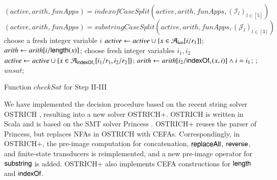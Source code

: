 
\begin{algorithm}[tbp]
	\small
	{
		$(active, arith, \mathit{funApps}) = \mathit{indexofCaseSplit}(active, arith, \mathit{funApps}, (\mathcal{I}_l)_{l \in [5]})$\; 
		$(active, arith, \mathit{funApps})= \mathit{substringCaseSplit}(active, arith, \mathit{funApps}, (\mathcal{J}_l)_{l \in [3]})$\; 
		{
			choose a fresh integer variable $i$\;
			$active \leftarrow active \cup \{x \in \mathcal{A}_{\rm len}[i/r_1]\}$; $arith\leftarrow arith[i/\mathsf{length}(x)]$;
		}
		{
			choose fresh integer variables $i_1,i_2$\;
			$active \leftarrow active \cup \{x \in \mathcal{A}_{\mathsf{indexOf}_v}[i_1/r_1,i_2/r_2]\}$; $arith\leftarrow arith[i_2/\mathsf{indexOf}_v(x,i)] \wedge i=i_1$;
		}
		{
			;}
	}
	\Return $unsat$; 		
	\caption{Function $\mathit{checkSat}$
		for Step II-III} \label{alg:checksat} 
\end{algorithm}

We have implemented the decision procedure based on the recent string solver OSTRICH \cite{CHL+19}, resulting into a new solver OSTRICH+. OSTRICH is  written in Scala and is based on the SMT solver Princess \cite{princess08}. 
OSTRICH+ reuses the parser of Princess, but replaces NFAs in OSTRICH with CEFAs. Correspondingly, in OSTRICH+, the pre-image  computation for concatenation, $\mathsf{replaceAll}$, $\mathsf{reverse}$, and finite-state transducers is reimplemented, and a new pre-image operator for $\mathsf{substring}$ is added. OSTRICH+ also implements CEFA constructions for $\mathsf{length}$ and $\mathsf{indexOf}$.  

